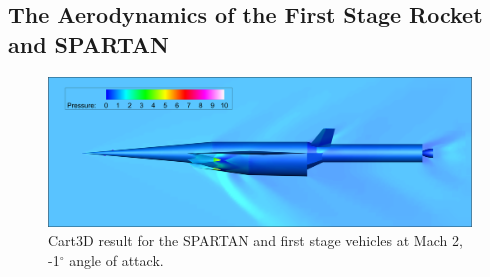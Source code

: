   \subsection{The Aerodynamics of the First Stage Rocket and SPARTAN}\label{sec:firststageaero}
  
  
  
  
   \begin{figure}[ht]
   	\centering
   	\includegraphics[width=0.8\linewidth]{figures/3_vehicle_design/CARTcontour}
   	\caption{Cart3D result for the SPARTAN and first stage vehicles at Mach 2, -1$^\circ$ angle of attack.}
   	\label{fig:CARTcontour}
   \end{figure}
   
